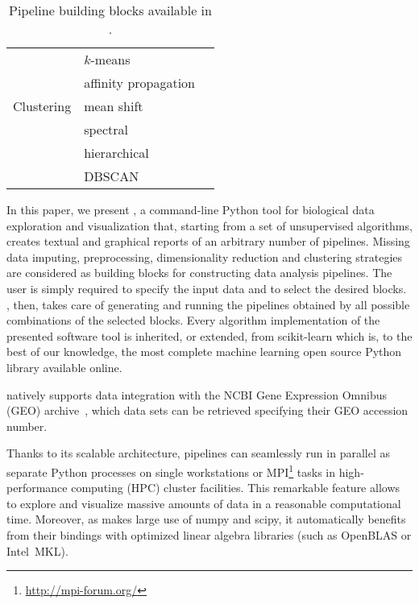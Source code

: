 \begin{table}[h!]
\begin{tabular}{lll}
        \multirow{5}{*}{Clustering} & $k$-means &  \cite{bishop2006pattern}\\
        & affinity propagation & \cite{frey2007clustering} \\
        & mean shift & \cite{comaniciu2002mean} \\
        & spectral & \cite{shi2000normalized} \\
        & hierarchical & \cite{friedman2001elements} \\
        & DBSCAN & \cite{ester1996density} \\
        \bottomrule
    \end{tabular}
    \caption{Pipeline building blocks available in \ade.}\label{tab:blocks}
\end{table}


In this paper, we present \ade, a command-line Python tool for biological data exploration and visualization that, starting from a set of unsupervised algorithms, creates textual and graphical reports of an arbitrary number of pipelines. Missing data imputing, preprocessing, dimensionality reduction and clustering strategies are considered as building blocks for constructing data analysis pipelines. The user is simply required to specify the input data and to select the desired blocks. \ade, then, takes care of generating and running the pipelines obtained by all possible combinations of the selected blocks. Every algorithm implementation of the presented software tool is inherited, or extended, from {\sc scikit-learn} \cite{scikit-learn} which is, to the best of our knowledge, the most complete machine learning open source Python library available online.

\ade natively supports data integration with the NCBI Gene Expression Omnibus (GEO) archive~\cite{barrett2013ncbi}, which data sets can be retrieved specifying their GEO accession number.

Thanks to its scalable architecture, \ade pipelines can seamlessly run in parallel as separate Python processes on single workstations or MPI\footnote{\url{http://mpi-forum.org/}} tasks in high-performance computing (HPC) cluster facilities. This remarkable feature allows to explore and visualize massive amounts of data in a reasonable computational time.
Moreover, as \ade makes large use of {\sc numpy} and {\sc scipy}, it automatically benefits from their bindings with optimized linear algebra libraries (such as OpenBLAS or Intel\textsuperscript{\textregistered}~MKL).

